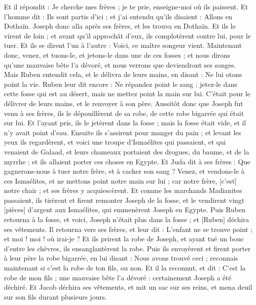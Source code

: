 \begin{multicols}{2}
Et il répondit : Je cherche mes frères ; je te prie, enseigne-moi où ils paissent.
Et l'homme dit : Ils sont partis d'ici ; et j'ai entendu qu'ils disaient : Allons en Dothaïn. Joseph donc alla après ses frères, et les trouva en Dothaïn.
Et ils le virent de loin ; et avant qu'il approchât d'eux, ils complotèrent contre lui, pour le tuer.
Et ils se dirent l'un à l'autre : Voici, ce maître songeur vient.
Maintenant donc, venez, et tuons-le, et jetons-le dans une de ces fosses ; et nous dirons qu'une mauvaise bête l'a dévoré, et nous verrons que deviendront ses songes.
Mais Ruben entendit cela, et le délivra de leurs mains, en disant : Ne lui otons point la vie.
Ruben leur dit encore : Ne répandez point le sang ; jetez-le dans cette fosse qui est au désert, mais ne mettez point la main sur lui. C'était pour le délivrer de leurs mains, et le renvoyer à son père.
Aussitôt donc que Joseph fut venu à ses frères, ils le dépouillèrent de sa robe, de cette robe bigarrée qui était sur lui.
Et l'ayant pris, ils le jetèrent dans la fosse ; mais la fosse était vide, et il n'y avait point d'eau.
Ensuite ils s'assirent pour manger du pain ; et levant les yeux ils regardèrent, et voici une troupe d'Ismaélites qui passaient, et qui venaient de Galaad, et leurs chameaux portaient des drogues, du baume, et de la myrrhe ; et ils allaient porter ces choses en Egypte.
Et Juda dit à ses frères : Que gagnerons-nous à tuer notre frère, et à cacher son sang ?
Venez, et vendons-le à ces Ismaélites, et ne mettons point notre main sur lui ; car notre frère, [c'est] notre chair ; et ses frères y acquiescèrent.
Et comme les marchands Madianites passaient, ils tirèrent et firent remonter Joseph de la fosse, et le vendirent vingt [pièces] d'argent aux Ismaélites, qui emmenèrent Joseph en Egypte.
Puis Ruben retourna à la fosse, et voici, Joseph n'était plus dans la fosse ; et [Ruben] déchira ses vêtements.
Il retourna vers ses frères, et leur dit : L'enfant ne se trouve point ; et moi ! moi ! où irai-je ?
Et ils prirent la robe de Joseph, et ayant tué un bouc d'entre les chèvres, ils ensanglantèrent la robe.
Puis ils envoyèrent et firent porter à leur père la robe bigarrée, en lui disant : Nous avons trouvé ceci ; reconnais maintenant si c'est la robe de ton fils, ou non.
Et il la reconnut, et dit : C'est la robe de mon fils ; une mauvaise bête l'a dévoré : certainement Joseph a été déchiré.
Et Jacob déchira ses vêtements, et mit un sac sur ses reins, et mena deuil sur son fils durant plusieurs jours.

\end{multicols}
